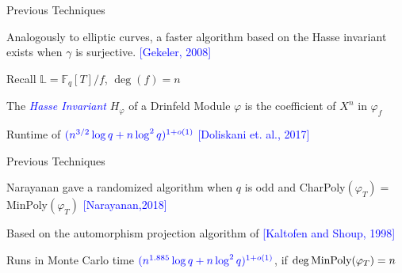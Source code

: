 \documentclass{beamer}
\newcommand{\blue}{\textcolor{blue}}
\newcommand{\spa}{\vspace{0.2cm}}
\begin{document}







\begin{frame}{Previous Techniques}


Analogously to elliptic curves, a faster algorithm based on the Hasse invariant exists when $\gamma$ is surjective. \blue{[Gekeler, 2008]}

\spa

Recall $\mathbb{L} = \mathbb{F}_q[T]/f$, $\deg(f) = n$

\begin{definition}
    \item The \blue{\textit{Hasse Invariant}} $H_{\varphi}$ of a Drinfeld Module $\varphi$ is the coefficient of $X^n$ in $\varphi_f$
\end{definition}

\spa

Runtime of $\blue{(n^{3/2} \log q + n \log^2 q)^{1+o(1)}}$ \blue{[Doliskani et. al., 2017]}








\end{frame}


\begin{frame}{Previous Techniques}

Narayanan gave a randomized algorithm when $q$ is odd and  CharPoly$(\varphi_T) = $ MinPoly$(\varphi_T)$ \blue{[Narayanan,2018]}

\spa

Based on the automorphism projection algorithm of \blue{[Kaltofen and Shoup, 1998]}

\spa


Runs in Monte Carlo time $\blue{(n^{1.885} \log q + n \log^2 q)^{1+o(1)}}$,
  if $ \deg \textnormal{MinPoly}(\varphi_T) = n$
    
\end{frame}

\end{document}

